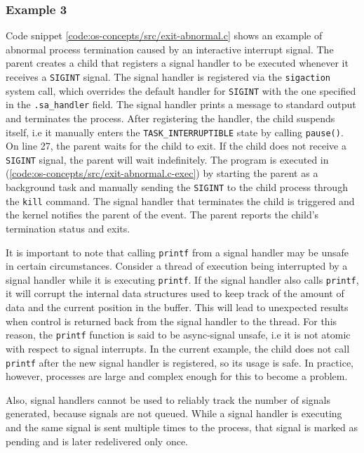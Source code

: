 \subsubsection{Example 3}
Code snippet \ref{code:os-concepts/src/exit-abnormal.c} shows an example of abnormal process termination 
caused by an interactive interrupt signal. The parent creates a child that registers a signal handler 
to be executed whenever it receives a \verb|SIGINT| signal. The signal handler is registered via the 
\verb|sigaction| system call, which overrides the default handler for \verb|SIGINT| with the one 
specified in the \verb|.sa_handler| field. 
The signal handler prints a message to
standard output and terminates the process.
After registering the handler, the child suspends itself, i.e it manually enters the \verb|TASK_INTERRUPTIBLE| state by 
calling \verb|pause()|. 
On line 27, the parent waits for the child to exit. 
If the child does not receive a \verb|SIGINT| signal, the parent will wait indefinitely.
The program is executed in (\ref{code:os-concepts/src/exit-abnormal.c-exec}) by starting the parent as a background task and 
manually sending the \verb|SIGINT| to the child process through the \verb|kill| command.  
The signal handler that terminates the child is triggered and the kernel notifies the parent of the event.
The parent reports the child's termination status and exits. 

It is important to note that calling \verb|printf| from a signal handler may be unsafe in certain circumstances.
Consider a thread of execution being interrupted by a signal handler while it is executing \verb|printf|.
If the signal handler also calls \verb|printf|, it will corrupt the internal data structures used to 
keep track of the amount of data and the current position in the buffer. This will lead to 
unexpected results when control is returned back from the signal handler to the thread.
For this reason, the \verb|printf| function is said to be async-signal unsafe, i.e it is not atomic 
with respect to signal interrupts.  In the current example, the child does not call \verb|printf|
after the new signal handler is registered, so its usage is safe. 
In practice, however, processes 
are large and complex enough for this to become a problem. 

Also, signal handlers cannot be used to reliably track the number of signals generated, because 
signals are not queued. While a signal handler is executing and the same signal is sent 
multiple times to the process, that signal is marked as pending and is later redelivered only once.

